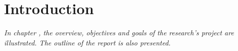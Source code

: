 \chapter{Introduction}
\label{chapter:introduction}

\textit{In chapter \thechapter, the overview, objectives and goals of the research's project are illustrated. The outline of the report is also presented.}




